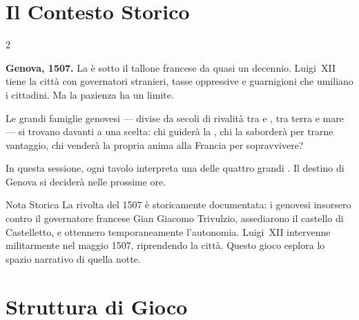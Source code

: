 
\chapter{Il Contesto Storico}
\label{ch:contesto}


\begin{multicols}{2}

\noindent\textbf{Genova, 1507.} La  è sotto il tallone francese da quasi un decennio.
Luigi~XII tiene la città con governatori stranieri, tasse oppressive e guarnigioni che umiliano i cittadini.
Ma la pazienza ha un limite.

Le grandi famiglie genovesi — divise da secoli di rivalità tra  e ,
tra terra e mare — si trovano davanti a una scelta: chi guiderà la ,
chi la saborderà per trarne vantaggio, chi venderà la propria anima alla Francia per sopravvivere?

In questa sessione, ogni tavolo interpreta una delle quattro grandi .
Il destino di Genova si deciderà nelle prossime ore.

\columnbreak

\begin{rulebox}{Nota Storica}
La rivolta del 1507 è storicamente documentata: i genovesi insorsero contro il governatore
francese Gian Giacomo Trivulzio, assediarono il castello di Castelletto, e ottennero
temporaneamente l'autonomia. Luigi~XII intervenne militarmente nel maggio 1507,
riprendendo la città. Questo gioco esplora lo spazio narrativo di quella notte.
\end{rulebox}

\end{multicols}

\chapter{Struttura di Gioco}
\label{ch:struttura}

